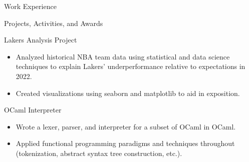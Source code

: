 \documentclass{article}
\newlength{\tabin}
\newlength{\secsep}
\newcommand{\lineunder}{\vspace*{-8pt} \\ \hspace*{-6pt} \hrulefill \\ \vspace*{-15pt}}
\newenvironment{tabbedsection}[1]{
  \begin{list}{}{
      \setlength{\itemsep}{0pt}
      \setlength{\labelsep}{0pt}
      \setlength{\labelwidth}{0pt}
      \setlength{\leftmargin}{\tabin}
      \setlength{\rightmargin}{\tabin}
      \setlength{\listparindent}{0pt}
      \setlength{\parsep}{0pt}
      \setlength{\parskip}{0pt}
      \setlength{\partopsep}{0pt}
      \setlength{\topsep}{#1}
    }
  \item[]
}{\end{list}}
\newenvironment{resume_section}[1]{
  \filbreak
  \vspace{2\secsep}
  \textsc{\large#1}
  \lineunder
  \begin{tabbedsection}{\secsep}
}{\end{tabbedsection}}
\newenvironment{resume_subsection}[2][]{
  \textbf{#2} \hfill {\footnotesize #1} \hspace{-4em}
  \begin{tabbedsection}{0.5\secsep}
}{\end{tabbedsection}}
\newenvironment{subitems}{
  \renewcommand{\labelitemi}{-}
  \begin{itemize}
      \setlength{\labelsep}{1em}
}{\end{itemize}}
\newenvironment{resume_employer}[4]{
  \vspace{\secsep}
  \textbf{#1} \\ 
  \indent {\small #2} \hfill {\footnotesize#3 (#4)} \hspace{-4em}
  \begin{tabbedsection}{0pt}
  \begin{subitems}
}{\end{subitems}\end{tabbedsection}}
\begin{document}
\begin{resume_section}{Work Experience}
\end{resume_section}

\begin{resume_section}{Projects, Activities, and Awards}
  \begin{resume_subsection}{Lakers Analysis Project}
  \begin{subitems}
  	\item Analyzed historical NBA team data using statistical and data science techniques to explain Lakers' underperformance relative to expectations in 2022.
  	\item Created visualizations using seaborn and matplotlib to aid in exposition.
  \end{subitems}
  \end{resume_subsection}
  
  
  \begin{resume_subsection}[(Nov. 2021)]{OCaml Interpreter}
  \begin{subitems}
    \item Wrote a lexer, parser, and interpreter for a subset of OCaml in OCaml.
    \item Applied functional programming paradigms and techniques throughout (tokenization, abstract syntax tree construction, etc.). 
    \end{subitems}
  \end{resume_subsection}


\end{resume_section}
\end{document}
